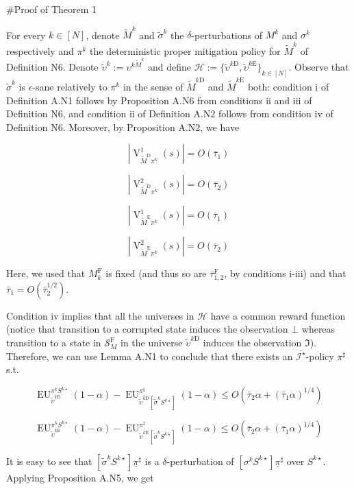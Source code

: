 \documentclass[a4paper]{article}
\newcommand{\AP}[1]{\left(#1\right)}
\newcommand{\AB}[1]{\left[#1\right]}
\newcommand{\Abs}[1]{\left\vert #1 \right\vert}
\newcommand{\St}{\mathcal{S}}
\newcommand{\In}{\mathcal{I}}
\newcommand{\Hy}{\mathcal{H}}
\newcommand{\RMD}{\mathrm{D}}
\newcommand{\RME}{\mathrm{E}}
\newcommand{\RMF}{\mathrm{F}}
\newcommand{\SF}{\St^{\RMF}}
\newcommand{\V}{\operatorname{V}}
\newcommand{\EU}{\operatorname{EU}}
\begin{document}
\#Proof of Theorem 1

For every $k \in [N]$, denote $\tilde{M}^k$ and $\tilde{\sigma}^k$ the $\delta$-perturbations of $M^k$ and $\sigma^k$ respectively and $\pi^k$ the deterministic proper mitigation policy for $\tilde{M}^k$ of Definition N6. Denote $\tilde{\upsilon}^k:=\upsilon^{k\tilde{M}^k}$ and define $\Hy:=\{\tilde{\upsilon}^{k\RMD},\tilde{\upsilon}^{k\RME}\}_{k \in [N]}$. Observe that $\tilde{\sigma}^{k}$ is $\epsilon$-sane relatively to $\pi^k$ in the sense of $\tilde{M}^{k\RMD}$ and $\tilde{M}^{k\RME}$ both: condition i of Definition A.N1 follows by Proposition A.N6 from conditions ii and iii of Definition N6, and condition ii of Definition A.N2 follows from condition iv of Definition N6. Moreover, by Proposition A.N2, we have

$$\Abs{\V_{\tilde{M}^\RMD\pi^k}^1(s)} = O\AP{\bar{\tau}_1}$$

$$\Abs{\V_{\tilde{M}^\RMD\pi^k}^2(s)} = O\AP{\bar{\tau}_2}$$

$$\Abs{\V_{\tilde{M}^\RME\pi^k}^1(s)} = O\AP{\bar{\tau}_1}$$

$$\Abs{\V_{\tilde{M}^\RME\pi^k}^2(s)} = O\AP{\bar{\tau}_2}$$

Here, we used that $M^\RMF_k$ is fixed (and thus so are $\bar{\tau}_{1,2}^\RMF$, by conditions i-iii) and that $\bar{\tau}_1 = O\AP{\bar{\tau}_2^{1/2}}$.

Condition iv implies that all the universes in $\Hy$ have a common reward function (notice that transition to a corrupted state induces the observation $\bot$ whereas transition to a state in $\SF_M$ in the universe $\tilde{\upsilon}^{k\RMD}$ induces the observation $\Im$). Therefore, we can use Lemma A.N1 to conclude that there exists an $\overline{\In^\star}$-policy $\pi^\sharp$ s.t.

$$\EU_{\tilde{\upsilon}^{k\RMD}}^{\pi^kS^{k\star}}(1-\alpha) - \EU_{\overline{\tilde{\upsilon}^{k\RMD}}\AB{\tilde{\sigma}^k S^{k\star}}}^{\pi^\sharp}(1-\alpha) \leq O\AP{\bar{\tau}_2 \alpha + (\bar{\tau}_1 \alpha)^{1/4}}$$

$$\EU_{\tilde{\upsilon}^{k\RME}}^{\pi^kS^{k\star}}(1-\alpha) - \EU_{\overline{\tilde{\upsilon}^{k\RME}}\AB{\tilde{\sigma}^k S^{k\star}}}^{\pi^\sharp}(1-\alpha) \leq O\AP{\bar{\tau}_2 \alpha + (\bar{\tau}_1 \alpha)^{1/4}}$$

It is easy to see that $\AB{\tilde{\sigma}^k S^{k\star}}\underline{\pi}^\sharp$ is a $\delta$-perturbation of $\AB{\sigma^k S^{k\star}}\underline{\pi}^\sharp$ over $S^{k\star}$. Applying Proposition A.N5, we get
\end{document}
